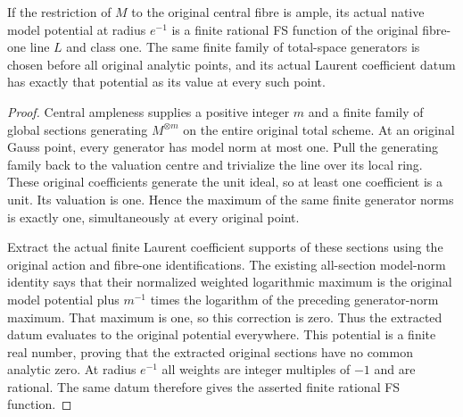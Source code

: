\begin{theorem}
\label{thm:central-ample-original-exact-finite-fs}
\leanok
If the restriction of $M$ to the original central fibre is ample, its
actual native model potential at radius $e^{-1}$ is a finite rational
FS function of the original fibre-one line $L$ and class one.
The same finite family of total-space generators is chosen before all
original analytic points, and its actual Laurent coefficient datum has
exactly that potential as its value at every such point.
\end{theorem}
\begin{proof}
\leanok
Central ampleness supplies a positive integer $m$ and a finite family
of global sections generating $M^{\otimes m}$ on the entire original
total scheme. At an original Gauss point, every generator has model norm
at most one. Pull the generating family back to the valuation centre
and trivialize the line over its local ring. These original coefficients
generate the unit ideal, so at least one coefficient is a unit. Its
valuation is one. Hence the maximum of the same finite generator norms
is exactly one, simultaneously at every original point.

Extract the actual finite Laurent coefficient supports of these sections
using the original action and fibre-one identifications. The existing
all-section model-norm identity says that their normalized weighted
logarithmic maximum is the original model potential plus $m^{-1}$ times
the logarithm of the preceding generator-norm maximum. That maximum is
one, so this correction is zero. Thus the extracted datum evaluates to
the original potential everywhere. This potential is a finite real
number, proving that the extracted original sections have no common
analytic zero. At radius $e^{-1}$ all weights are integer multiples of
$-1$ and are rational. The same datum therefore gives the asserted
finite rational FS function.
\end{proof}

